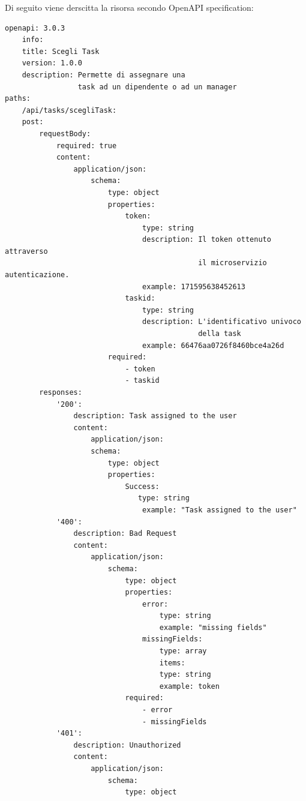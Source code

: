 \documentclass{report}
\begin{document}
Di seguito viene derscitta la risorsa secondo OpenAPI specification:


\begin{verbatim}
openapi: 3.0.3
    info:
    title: Scegli Task
    version: 1.0.0
    description: Permette di assegnare una
                 task ad un dipendente o ad un manager
paths:
    /api/tasks/scegliTask:
    post:
        requestBody:
            required: true
            content:
                application/json:
                    schema:
                        type: object
                        properties:
                            token:
                                type: string
                                description: Il token ottenuto attraverso
                                             il microservizio autenticazione.
                                example: 171595638452613
                            taskid:
                                type: string
                                description: L'identificativo univoco
                                             della task
                                example: 66476aa0726f8460bce4a26d
                        required:
                            - token
                            - taskid
        responses:
            '200':
                description: Task assigned to the user
                content:
                    application/json:
                    schema:
                        type: object
                        properties:
                            Success:
                               type: string
                                example: "Task assigned to the user"
            '400':
                description: Bad Request
                content:
                    application/json:
                        schema:
                            type: object
                            properties:
                                error:
                                    type: string
                                    example: "missing fields"
                                missingFields:
                                    type: array
                                    items:
                                    type: string
                                    example: token
                            required:
                                - error
                                - missingFields
            '401':
                description: Unauthorized
                content:
                    application/json:
                        schema:
                            type: object

\end{verbatim}
\end{document}
